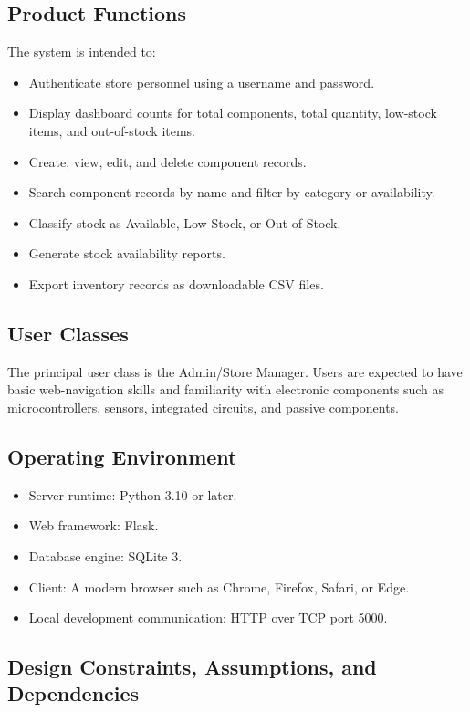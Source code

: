 \documentclass[conference]{IEEEtran}
\begin{document}
\subsection{Product Functions}

The system is intended to:
\begin{itemize}
\item Authenticate store personnel using a username and password.
\item Display dashboard counts for total components, total quantity, low-stock items, and out-of-stock items.
\item Create, view, edit, and delete component records.
\item Search component records by name and filter by category or availability.
\item Classify stock as Available, Low Stock, or Out of Stock.
\item Generate stock availability reports.
\item Export inventory records as downloadable CSV files.
\end{itemize}

\subsection{User Classes}

The principal user class is the Admin/Store Manager. Users are expected to have basic web-navigation skills and familiarity with electronic components such as microcontrollers, sensors, integrated circuits, and passive components.

\subsection{Operating Environment}

\begin{itemize}
\item Server runtime: Python 3.10 or later.
\item Web framework: Flask.
\item Database engine: SQLite 3.
\item Client: A modern browser such as Chrome, Firefox, Safari, or Edge.
\item Local development communication: HTTP over TCP port 5000.
\end{itemize}

\subsection{Design Constraints, Assumptions, and Dependencies}
\end{document}
